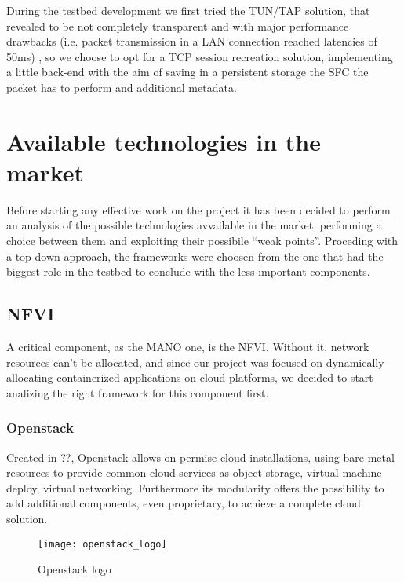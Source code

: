 During the testbed development we first tried the TUN/TAP solution, that
revealed to be not completely transparent and with major performance drawbacks
(i.e. packet transmission in a LAN connection reached latencies of 50ms)
, so we choose to opt for a TCP session recreation solution,
implementing a little back-end with the aim of saving in a persistent storage
the SFC the packet has to perform and additional metadata.

\section{Available technologies in the market}
\label{chap:prjan:sec:tech}

Before starting any effective work on the project it has been decided to 
perform an analysis of the possible technologies avvailable in the market, 
performing a choice between them and exploiting their possibile ``weak 
points''. Proceding with a top-down approach, the frameworks were choosen from 
the one that had the biggest role in the testbed to conclude with the 
less-important components.

\subsection{NFVI}

A critical component, as the MANO one, is the NFVI. Without it, network 
resources can't be allocated, and since our project was focused on dynamically 
allocating containerized applications on cloud platforms, we decided to start 
analizing the right framework for this component first.

\subsubsection{Openstack}
\label{chap:prjan:sec:openstack}
Created in ??, Openstack allows
on-permise cloud installations, using bare-metal resources to provide common
cloud services as object storage, virtual machine deploy, virtual networking.
Furthermore its modularity offers the possibility to add additional components,
even proprietary, to achieve a complete cloud solution.
\begin{figure}[t]
 \centering \texttt{[image: openstack\_logo]}
 \caption{Openstack logo}
 \label{chap:prjan:img:openstack_logo}
\end{figure}

